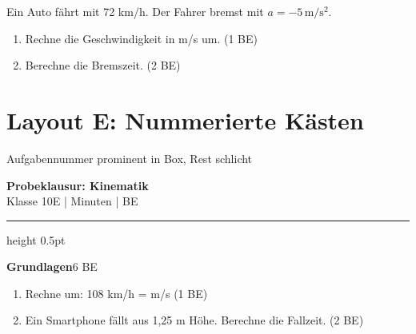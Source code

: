 \documentclass[11pt,a4paper]{article}
\begin{document}
\vspace{0.3cm}
Ein Auto fährt mit 72 km/h. Der Fahrer bremst mit $a = -5\,\mathrm{m/s^2}$.

\begin{enumerate}
\item[a)] Rechne die Geschwindigkeit in m/s um. \hfill (1 BE)
\item[b)] Berechne die Bremszeit. \hfill (2 BE)
\end{enumerate}

\vspace{1cm}

\newpage
\section*{Layout E: Nummerierte Kästen}
\vspace{-0.3cm}
{\small Aufgabennummer prominent in Box, Rest schlicht}

\vspace{0.5cm}

\begin{center}
{\Large\bfseries Probeklausur: Kinematik}\\[0.2cm]
{\small Klasse 10E \quad| Minuten \quad| BE}
\end{center}

\vspace{0.3cm}
{\color{border}\hrule height 0.5pt}
\vspace{0.5cm}

\noindent
{}
\hspace{0.3cm}
\begin{minipage}[t]{0.85\textwidth}
{\bfseries Grundlagen}\hfill{\small 6 BE}\\[0.2cm]
\begin{enumerate}
\item[a)] Rechne um: 108 km/h = \underline{\hspace{2cm}} m/s \hfill (1 BE)
\item[b)] Ein Smartphone fällt aus 1,25 m Höhe. Berechne die Fallzeit. \hfill (2 BE)
\end{enumerate}
\end{minipage}
\end{document}
